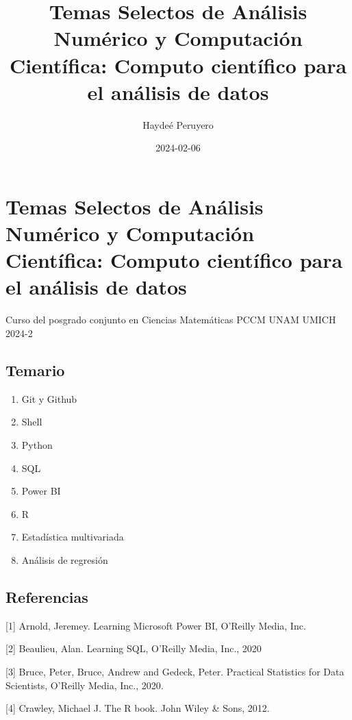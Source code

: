 \documentclass[
]{book}
\title{Temas Selectos de Análisis Numérico y Computación Científica: Computo científico para el análisis de datos}
\author{Haydeé Peruyero}
\date{2024-02-06}
\begin{document}
\maketitle

{
\setcounter{tocdepth}{1}
\tableofcontents
}
\hypertarget{temas-selectos-de-anuxe1lisis-numuxe9rico-y-computaciuxf3n-cientuxedfica-computo-cientuxedfico-para-el-anuxe1lisis-de-datos}{%
\chapter{Temas Selectos de Análisis Numérico y Computación Científica: Computo científico para el análisis de datos}\label{temas-selectos-de-anuxe1lisis-numuxe9rico-y-computaciuxf3n-cientuxedfica-computo-cientuxedfico-para-el-anuxe1lisis-de-datos}}

Curso del posgrado conjunto en Ciencias Matemáticas PCCM UNAM UMICH 2024-2

\hypertarget{temario}{%
\section{Temario}\label{temario}}

\begin{enumerate}
\def\labelenumi{\arabic{enumi}.}
\item
  Git y Github
\item
  Shell
\item
  Python
\item
  SQL
\item
  Power BI
\item
  R
\item
  Estadística multivariada
\item
  Análisis de regresión
\end{enumerate}

\hypertarget{referencias}{%
\section{Referencias}\label{referencias}}

{[}1{]} Arnold, Jeremey. Learning Microsoft Power BI, O'Reilly Media, Inc.

{[}2{]} Beaulieu, Alan. Learning SQL, O'Reilly Media, Inc., 2020

{[}3{]} Bruce, Peter, Bruce, Andrew and Gedeck, Peter. Practical Statistics for Data Scientists, O'Reilly Media, Inc., 2020.

{[}4{]} Crawley, Michael J. The R book. John Wiley \& Sons, 2012.
\end{document}
